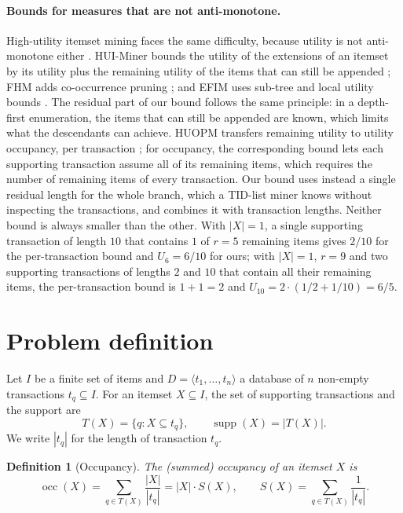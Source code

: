 \documentclass[pdflatex,sn-mathphys,Numbered]{sn-jnl}
\theoremstyle{thmstyleone}
\theoremstyle{thmstyletwo}
\theoremstyle{thmstylethree}
\newtheorem{definition}{Definition}
\newcommand{\supp}{\operatorname{supp}}
\newcommand{\socc}{\operatorname{occ}}
\newcommand{\Ucap}{U}
\begin{document}
\paragraph{Bounds for measures that are not anti-monotone.}
High-utility itemset mining faces the same difficulty, because utility is not anti-monotone either \cite{fournier2019survey,gan2021survey}. HUI-Miner bounds the utility of the extensions of an itemset by its utility plus the remaining utility of the items that can still be appended \cite{liu2012huiminer}; FHM adds co-occurrence pruning \cite{fournier2014fhm}; and EFIM uses sub-tree and local utility bounds \cite{zida2017efim}. The residual part of our bound follows the same principle: in a depth-first enumeration, the items that can still be appended are known, which limits what the descendants can achieve. HUOPM transfers remaining utility to utility occupancy, per transaction \cite{gan2020huopm}; for occupancy, the corresponding bound lets each supporting transaction assume all of its remaining items, which requires the number of remaining items of every transaction. Our bound uses instead a single residual length for the whole branch, which a TID-list miner knows without inspecting the transactions, and combines it with transaction lengths. Neither bound is always smaller than the other. With $|X| = 1$, a single supporting transaction of length $10$ that contains $1$ of $r = 5$ remaining items gives $2/10$ for the per-transaction bound and $\Ucap_6 = 6/10$ for ours; with $|X| = 1$, $r = 9$ and two supporting transactions of lengths $2$ and $10$ that contain all their remaining items, the per-transaction bound is $1 + 1 = 2$ and $\Ucap_{10} = 2 \cdot (1/2 + 1/10) = 6/5$.

\section{Problem definition}\label{sec:prelim}

Let $I$ be a finite set of items and $D = \langle t_1, \dots, t_n \rangle$ a database of $n$ non-empty transactions $t_q \subseteq I$. For an itemset $X \subseteq I$, the set of supporting transactions and the support are
\begin{equation}
T(X) = \{ q : X \subseteq t_q \}, \qquad \supp(X) = |T(X)|.
\end{equation}
We write $|t_q|$ for the length of transaction $t_q$.

\begin{definition}[Occupancy]\label{def:occ}
The (summed) occupancy of an itemset $X$ is
\begin{equation}\label{eq:occ}
\socc(X) = \sum_{q \in T(X)} \frac{|X|}{|t_q|} = |X| \cdot S(X), \qquad S(X) = \sum_{q \in T(X)} \frac{1}{|t_q|}.
\end{equation}
\end{definition}
\end{document}
